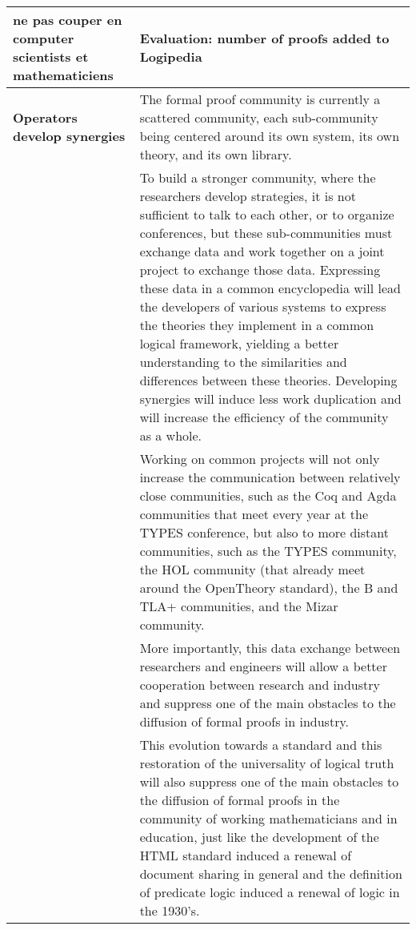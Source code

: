 \begin{longtable}{|p{}|p{}|}
{\color{red} ne pas couper en computer scientists et mathematiciens}


&
\begin{framed}
  {\color{red} Evaluation: number of proofs added to Logipedia}
\end{framed}\\

\hline
{\bf Operators develop synergies}
&
The formal proof community is currently a scattered community, each
sub-community being centered around its own system, its own theory,
and its own library.\\
&
\hspace{0.4cm}
To build a stronger community, where the researchers develop
strategies, it is not sufficient to talk to each other, or to organize
conferences, but these sub-communities must exchange data and work
together on a joint project to exchange those data.
Expressing these data in a common encyclopedia will
lead the developers of various systems to express the theories they
implement in a common logical framework, yielding a better understanding
to the similarities and differences between these theories.
Developing synergies will induce less work duplication and will increase
the efficiency of the community as a whole.\\
&
\hspace{0.4cm}
Working on common projects will not only increase the communication
between relatively close communities, such as the Coq and 
  Agda communities that meet every year at the TYPES conference, but
also to more distant communities, such as the TYPES community, the HOL
community (that already meet around the OpenTheory standard),
the B and TLA+ communities, and the Mizar community.\\
&
\hspace{0.4cm}
More importantly, this data exchange between researchers and
engineers will allow a better
cooperation between research and industry and suppress one of the main
obstacles to the diffusion of formal proofs in industry.\\
&
\hspace{0.4cm}
This evolution towards a standard and this restoration of the
universality of logical truth will also suppress one of the main
obstacles to the diffusion of formal proofs in the community of
working mathematicians and in education, just like the development
of the HTML standard induced a renewal of document sharing in general
and the definition of predicate logic induced a renewal of logic in
the 1930's.\\

\end{longtable}

